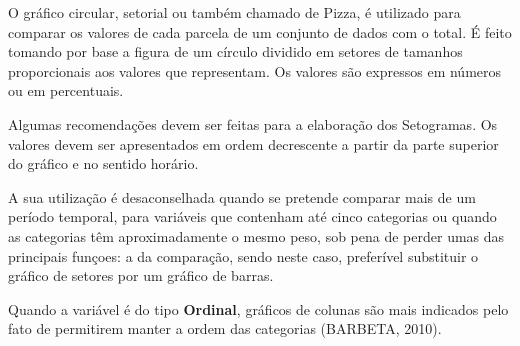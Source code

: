 O gráfico circular, setorial ou também chamado de Pizza, é
utilizado para comparar os valores de cada parcela de um conjunto
de dados com o total. É feito tomando por base a figura de um
círculo dividido em setores de tamanhos proporcionais aos valores
que representam. Os valores são expressos em números ou em percentuais. \vskip0.3cm

Algumas recomendações devem ser feitas para a elaboração dos
Setogramas. Os valores devem ser apresentados em ordem
decrescente a partir da parte superior do gráfico e no sentido
horário.\vskip0.3cm

A sua utilização é desaconselhada quando se pretende comparar mais
de um período temporal, para variáveis que contenham até cinco
categorias ou quando as categorias têm aproximadamente o mesmo
peso, sob pena de perder umas das principais funçoes: a da
comparação, sendo neste caso, preferível substituir o gráfico de
setores por um gráfico de barras.\vskip0.3cm

Quando a variável é do tipo \textbf{Ordinal}, gráficos de colunas são mais indicados pelo fato de permitirem manter a ordem das categorias (BARBETA, 2010).














